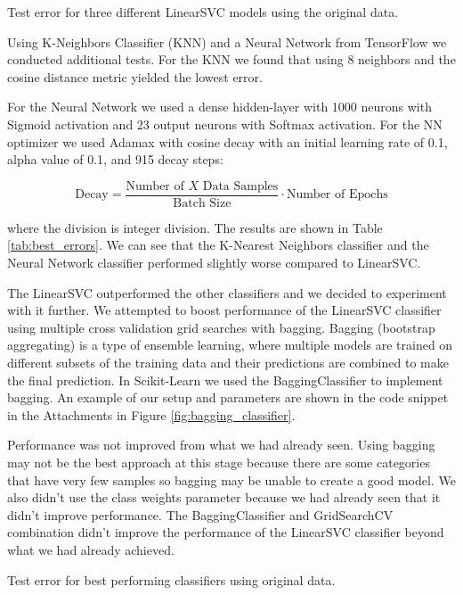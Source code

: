 \begin{table}[!ht]
\centering
\caption{Test error for three different LinearSVC models using the original data.}

\label{tab:lsvc_errors}
\end{table}

Using K-Neighbors Classifier (KNN) and a Neural Network from TensorFlow we conducted additional tests. For the KNN we found that using 8 neighbors and the cosine distance metric yielded the lowest error. 

For the Neural Network we used a dense hidden-layer with 1000 neurons with Sigmoid activation and 23 output neurons with Softmax activation. For the NN optimizer we used Adamax with cosine decay with an initial learning rate of 0.1, alpha value of 0.1, and 915 decay steps:

\begin{equation}
    \text{Decay} = \frac{\text{Number of $X$ Data Samples}}{\text{Batch Size}} \cdot \text{Number of Epochs}
\end{equation}

where the division is integer division. The results are shown in Table \ref{tab:best_errors}. We can see that the K-Nearest Neighbors classifier and the Neural Network classifier performed slightly worse compared to LinearSVC.

The LinearSVC outperformed the other classifiers and we decided to experiment with it further. We attempted to boost performance of the LinearSVC classifier using multiple cross validation grid searches with bagging. Bagging (bootstrap aggregating) is a type of ensemble learning, where multiple models are trained on different subsets of the training data and their predictions are combined to make the final prediction. In Scikit-Learn we used the BaggingClassifier to implement bagging. An example of our setup and parameters are shown in the code snippet in the Attachments in Figure \ref{fig:bagging_classifier}.

Performance was not improved from what we had already seen. Using bagging may not be the best approach at this stage because there are some categories that have very few samples so bagging may be unable to create a good model. We also didn't use the class weights parameter because we had already seen that it didn't improve performance. The BaggingClassifier and GridSearchCV combination didn't improve the performance of the LinearSVC classifier beyond what we had already achieved.

\begin{table}[ht]
\centering
\caption{Test error for best performing classifiers using original data.}

\label{tab:best_errors}
\end{table}

